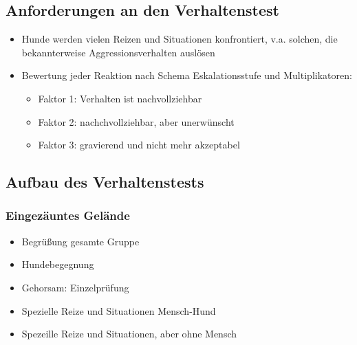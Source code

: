     \subsection{Anforderungen an den Verhaltenstest}
        \begin{itemize}
            \item Hunde werden vielen Reizen und Situationen konfrontiert, v.a. solchen, die bekannterweise Aggressionsverhalten auslösen
            \item Bewertung jeder Reaktion nach Schema Eskalationsstufe und Multiplikatoren:
            \begin{itemize}
                \item Faktor 1: Verhalten ist nachvollziehbar
                \item Faktor 2: nachchvollziehbar, aber unerwünscht
                \item Faktor 3: gravierend und nicht mehr akzeptabel
            \end{itemize}
        \end{itemize}

    \subsection{Aufbau des Verhaltenstests}
        \subsubsection{Eingezäuntes Gelände}
            \begin{itemize}
                \item Begrüßung gesamte Gruppe
                \item Hundebegegnung
                \item Gehorsam: Einzelprüfung
                \item Spezielle Reize und Situationen Mensch-Hund
                \item Spezeille Reize und Situationen, aber ohne Mensch
            \end{itemize}
